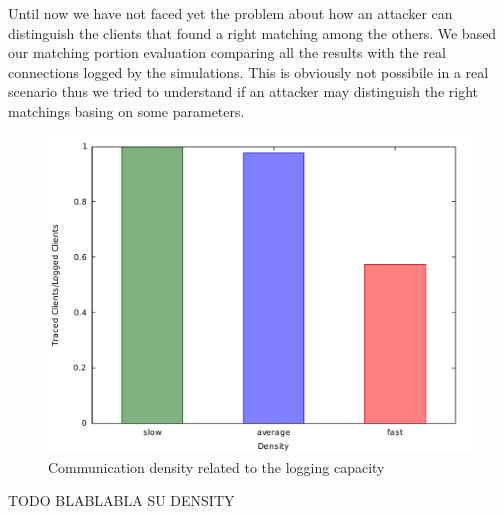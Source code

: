 Until now we have not faced yet the problem about how an attacker can distinguish
the clients that found a right matching among the others. We based our
matching portion evaluation comparing all the results with the real
connections logged by the simulations. This is obviously not possibile
in a real scenario thus we tried to understand if an attacker may
distinguish the right matchings basing on some parameters.

\begin{figure}[H]
\centering
\includegraphics[scale=0.35]{graphs/density_clients_ration.pdf}
\caption{Communication density related to the logging capacity}
\label{fig:g_density}
\end{figure}

TODO BLABLABLA SU DENSITY

